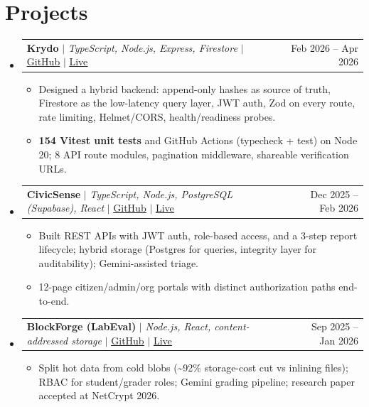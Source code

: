 \documentclass[letterpaper,11pt]{article}
\makeatletter
\newcommand{\resumeItem}[1]{
  \item\small{
    {#1 \vspace{-5pt}}
  }
}
\newcommand{\resumeProjectHeading}[2]{
  \item
    \begin{tabular*}{0.97\textwidth}{l@{\extracolsep{\fill}}r}
      \small#1 & #2 \\
    \end{tabular*}\vspace{-9pt}
}
\newcommand{\resumeSubHeadingListStart}{\begin{itemize}[leftmargin=0.15in, label={}]}
\newcommand{\resumeSubHeadingListEnd}{\end{itemize}}
\newcommand{\resumeItemListStart}{\begin{itemize}}
\newcommand{\resumeItemListEnd}{\end{itemize}\vspace{-10pt}}
\makeatother
\begin{document}
\section{Projects}
  \resumeSubHeadingListStart
    \resumeProjectHeading
      {\textbf{Krydo} $|$ \emph{TypeScript, Node.js, Express, Firestore} $|$ \href{https://github.com/nishant-uxs/krydo}{\underline{GitHub}} $|$ \href{https://krydo.onrender.com}{\underline{Live}}}{Feb 2026 -- Apr 2026}
      \resumeItemListStart
        \resumeItem{Designed a hybrid backend: append-only hashes as source of truth, Firestore as the low-latency query layer, JWT auth, Zod on every route, rate limiting, Helmet/CORS, health/readiness probes.}
        \resumeItem{\textbf{154 Vitest unit tests} and GitHub Actions (typecheck + test) on Node 20; 8 API route modules, pagination middleware, shareable verification URLs.}
      \resumeItemListEnd
    \resumeProjectHeading
      {\textbf{CivicSense} $|$ \emph{TypeScript, Node.js, PostgreSQL (Supabase), React} $|$ \href{https://github.com/nishant-uxs/CivicSense}{\underline{GitHub}} $|$ \href{https://civic-sense-six.vercel.app}{\underline{Live}}}{Dec 2025 -- Feb 2026}
      \resumeItemListStart
        \resumeItem{Built REST APIs with JWT auth, role-based access, and a 3-step report lifecycle; hybrid storage (Postgres for queries, integrity layer for auditability); Gemini-assisted triage.}
        \resumeItem{12-page citizen/admin/org portals with distinct authorization paths end-to-end.}
      \resumeItemListEnd
    \resumeProjectHeading
      {\textbf{BlockForge (LabEval)} $|$ \emph{Node.js, React, content-addressed storage} $|$ \href{https://github.com/nishant-uxs/labeval}{\underline{GitHub}} $|$ \href{https://blockchain-labeval.onrender.com}{\underline{Live}}}{Sep 2025 -- Jan 2026}
      \resumeItemListStart
        \resumeItem{Split hot data from cold blobs (\textasciitilde{}92\% storage-cost cut vs inlining files); RBAC for student/grader roles; Gemini grading pipeline; research paper accepted at NetCrypt 2026.}
      \resumeItemListEnd
  \resumeSubHeadingListEnd
\end{document}
